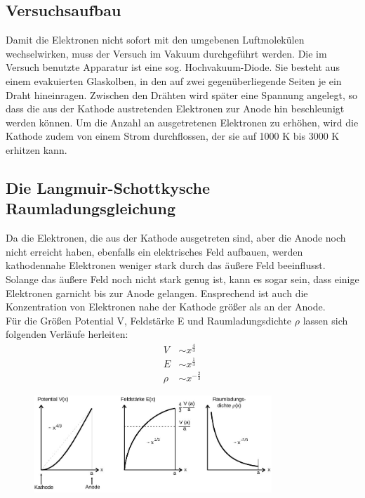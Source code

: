 \subsection{Versuchsaufbau}
Damit die Elektronen nicht sofort mit den umgebenen Luftmolekülen wechselwirken, muss der Versuch im Vakuum durchgeführt werden. Die im Versuch benutzte Apparatur ist eine sog. Hochvakuum-Diode. Sie besteht aus einem evakuierten Glaskolben, in den auf zwei gegenüberliegende Seiten je ein Draht hineinragen. Zwischen den Drähten wird später eine Spannung angelegt, so dass die aus der Kathode austretenden Elektronen zur Anode hin beschleunigt werden können. Um die Anzahl an ausgetretenen Elektronen zu erhöhen, wird die Kathode zudem von einem Strom durchflossen, der sie auf 1000 K bis 3000 K erhitzen kann. 

\subsection{ Die Langmuir-Schottkysche Raumladungsgleichung}
Da die Elektronen, die aus der Kathode ausgetreten sind, aber die Anode noch nicht erreicht haben, ebenfalls ein elektrisches Feld aufbauen, werden kathodennahe Elektronen weniger stark durch das äußere Feld beeinflusst. Solange das äußere Feld noch nicht stark genug ist, kann es sogar sein, dass einige Elektronen garnicht bis zur Anode gelangen. Ensprechend ist auch die Konzentration von Elektronen nahe der Kathode größer als an der Anode.\\
Für die Größen Potential V, Feldstärke E und Raumladungsdichte $\rho$ lassen sich folgenden Verläufe herleiten:
\begin{align*}
V  &\sim x^\frac{4}{3}\\
E  &\sim x^\frac{1}{3}\\
\rho  &\sim x^{-\frac{2}{3}}
\end{align*}


\begin{figure}
\includegraphics[width=0.8\textwidth]{pics/raumladungsgebiet.jpg}
\label{raumladungsgebiet}
\end{figure}


